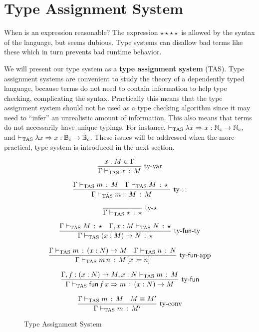 \section{\SLang{} Type Assignment System}
 
When is an expression reasonable? The expression $\star\star\star\star$ is allowed by the syntax of the language, but seems dubious.
Type systems can disallow bad terms like these which in turn prevents bad runtime behavior.
 
We will present our type system as a \textbf{type assignment system} (\ac{TAS}).
Type assignment systems are convenient to study the theory of a dependently typed language, because terms do not need to contain information to help type checking, complicating the syntax. %
Practically this means that the type assignment system should not be used as a type checking algorithm since it may need to ``infer'' an unrealistic amount of information.
This also means that terms do not necessarily have unique typings.
For instance, $\vdash_{\mathrm{TAS}}\lambda x\Rightarrow x:\mathbb{N}_{c}\rightarrow\mathbb{N}_{c}$, and $\vdash_{\mathrm{TAS}}\lambda x\Rightarrow x:\mathbb{B}_{c}\rightarrow\mathbb{B}_{c}$.
These issues will be addressed when the more practical, \bidir{} type system is introduced in the next section.
 
\begin{figure}
\[
\frac{x:M\in\Gamma}{\Gamma\vdash_{\mathrm{TAS}} x\,:\,M}\,\operatorname{ty-var}
\]
 
\[
\frac{\Gamma\vdash_{\mathrm{TAS}} m\,:\,M \quad \Gamma\vdash_{\mathrm{TAS}} M\,:\,\star\
}{\Gamma\vdash_{\mathrm{TAS}} m::M\,:\,M}
\,\operatorname{ty-::}
\]
 
\[
\frac{{\color{gray}\ }}{\Gamma\tasys\star\,:\,\star}\,\rulename{ty-\star}
\]
 
\[
\frac{\Gamma\vdash_{\mathrm{TAS}} M\,:\,\star\quad\Gamma,x:M\vdash_{\mathrm{TAS}} N\,:\,\star}{\Gamma\vdash_{\mathrm{TAS}}\left(x:M\right)\rightarrow N\,:\,\star}\,\operatorname{ty-\mathsf{fun}-ty}
\]
 
\[
\frac{\Gamma\vdash_{\mathrm{TAS}} m\,:\,\left(x:N\right)\rightarrow M\quad\Gamma\vdash_{\mathrm{TAS}} n\,:\,N}{\Gamma\vdash_{\mathrm{TAS}} m\,n\,:\,M\left[x\coloneqq n\right]}\,\operatorname{ty-\mathsf{fun}-app}
\]
 
\[
\frac{\Gamma,f:\left(x:N\right)\rightarrow M,x:N\vdash_{\mathrm{TAS}} m\,:\,M}{\Gamma\vdash_{\mathrm{TAS}}\mathsf{fun}\,f\,x\Rightarrow m\,:\,\left(x:N\right)\rightarrow M}\,\operatorname{ty-\mathsf{fun}}
\]
 
\[
\frac{\Gamma\vdash_{\mathrm{TAS}} m\,:\,M\quad M\equiv M'}{\Gamma\vdash_{\mathrm{TAS}} m\,:\,M'}\,\operatorname{ty-conv}
\]
 
\caption{\SLang{} Type Assignment System}
\label{fig:surface-TAS}
\end{figure}
 
